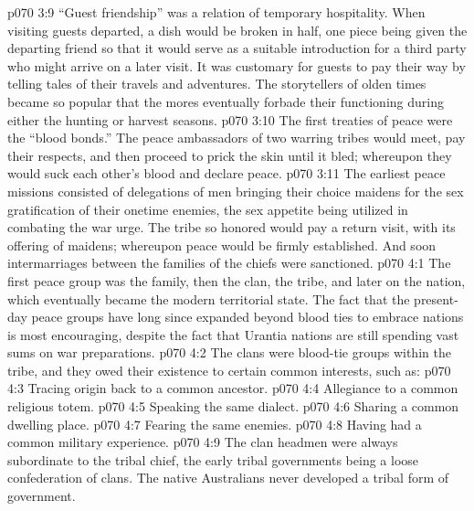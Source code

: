 \vs p070 3:9 “Guest friendship” was a relation of temporary hospitality. When visiting guests departed, a dish would be broken in half, one piece being given the departing friend so that it would serve as a suitable introduction for a third party who might arrive on a later visit. It was customary for guests to pay their way by telling tales of their travels and adventures. The storytellers of olden times became so popular that the mores eventually forbade their functioning during either the hunting or harvest seasons.
\vs p070 3:10 The first treaties of peace were the “blood bonds.” The peace ambassadors of two warring tribes would meet, pay their respects, and then proceed to prick the skin until it bled; whereupon they would suck each other’s blood and declare peace.
\vs p070 3:11 The earliest peace missions consisted of delegations of men bringing their choice maidens for the sex gratification of their onetime enemies, the sex appetite being utilized in combating the war urge. The tribe so honored would pay a return visit, with its offering of maidens; whereupon peace would be firmly established. And soon intermarriages between the families of the chiefs were sanctioned.
%
\vs p070 4:1 The first peace group was the family, then the clan, the tribe, and later on the nation, which eventually became the modern territorial state. The fact that the present\hyp{}day peace groups have long since expanded beyond blood ties to embrace nations is most encouraging, despite the fact that Urantia nations are still spending vast sums on war preparations.\plusone
\vs p070 4:2 The clans were blood\hyp{}tie groups within the tribe, and they owed their existence to certain common interests, such as:
\pc \vs p070 4:3 \bibnobreakspace Tracing origin back to a common ancestor.
\vs p070 4:4 \bibnobreakspace Allegiance to a common religious totem.
\vs p070 4:5 \bibnobreakspace Speaking the same dialect.
\vs p070 4:6 \bibnobreakspace Sharing a common dwelling place.
\vs p070 4:7 \bibnobreakspace Fearing the same enemies.
\vs p070 4:8 \bibnobreakspace Having had a common military experience.
\pc \vs p070 4:9 The clan headmen were always subordinate to the tribal chief, the early tribal governments being a loose confederation of clans. The native Australians never developed a tribal form of government.
